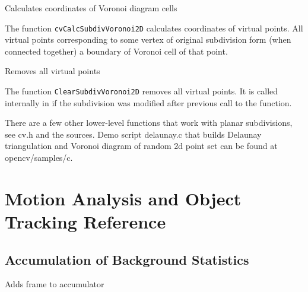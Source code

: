 \label{CalcSubdivVoronoi2D}

Calculates coordinates of Voronoi diagram cells


\begin{description}
\end{description}

The function \texttt{cvCalcSubdivVoronoi2D} calculates coordinates
of virtual points. All virtual points corresponding to some vertex of
original subdivision form (when connected together) a boundary of Voronoi
cell of that point.

\label{ClearSubdivVoronoi2D}

Removes all virtual points


\begin{description}
\end{description}

The function \texttt{ClearSubdivVoronoi2D} removes all virtual points. It
is called internally in  if the subdivision
was modified after previous call to the function.

There are a few other lower-level functions that work with planar
subdivisions, see cv.h and the sources. Demo script delaunay.c that
builds Delaunay triangulation and Voronoi diagram of random 2d point
set can be found at opencv/samples/c.

\section{Motion Analysis and Object Tracking Reference}

\subsection{Accumulation of Background Statistics}

\label{Acc}

Adds frame to accumulator


